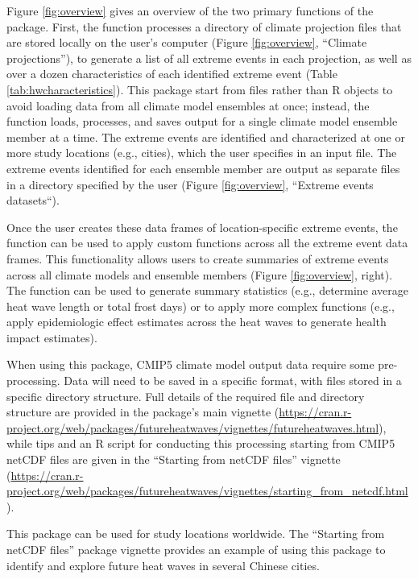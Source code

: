 Figure \ref{fig:overview} gives an overview of the two primary functions
of the  package. First, the 
function processes a directory of climate projection files that are
stored locally on the user's computer (Figure \ref{fig:overview},
``Climate projections''), to generate a list of all extreme events in
each projection, as well as over a dozen characteristics of each
identified extreme event (Table \ref{tab:hwcharacteristics}). This
package start from files rather than R objects to avoid loading data
from all climate model ensembles at once; instead, the function loads,
processes, and saves output for a single climate model ensemble member
at a time. The extreme events are identified and characterized at one or
more study locations (e.g., cities), which the user specifies in an
input file. The extreme events identified for each ensemble member are
output as separate files in a directory specified by the user (Figure
\ref{fig:overview}, ``Extreme events datasets``).

Once the user creates these data frames of location-specific extreme
events, the  function can be used to apply
custom functions across all the extreme event data frames. This
functionality allows users to create summaries of extreme events across
all climate models and ensemble members (Figure \ref{fig:overview},
right). The function can be used to generate summary statistics (e.g.,
determine average heat wave length or total frost days) or to apply more
complex functions (e.g., apply epidemiologic effect estimates across the
heat waves to generate health impact estimates).

When using this package, CMIP5 climate model output data require some
pre-processing. Data will need to be saved in a specific format, with
files stored in a specific directory structure. Full details of the
required file and directory structure are provided in the package's main
vignette
(\url{https://cran.r-project.org/web/packages/futureheatwaves/vignettes/futureheatwaves.html}),
while tips and an R script for conducting this processing starting from
CMIP5 netCDF files are given in the ``Starting from netCDF files''
vignette
(\url{https://cran.r-project.org/web/packages/futureheatwaves/vignettes/starting_from_netcdf.html}).

This package can be used for study locations worldwide. The ``Starting
from netCDF files'' package vignette provides an example of using this
package to identify and explore future heat waves in several Chinese
cities.

